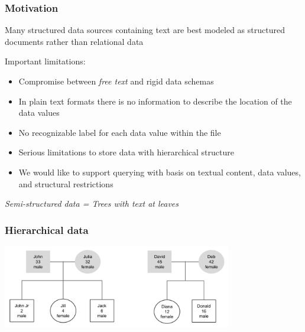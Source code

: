 \documentclass[svgnames]{beamer}
\begin{document}
\begin{frame}
\frametitle{Motivation}

\begin{block}{}
Many structured data sources containing text are best modeled as structured documents rather than  relational data
\end{block}

\begin{block}{}
Important limitations:
\begin{itemize}
  \item Compromise between {\it free text} and rigid data schemas
  \item In plain text formats there is no information to describe the location of the data values
  \item No recognizable label for each data value within the file
  \item Serious limitations to store data with hierarchical structure 
  \item We would like to support querying with basis on textual content, data values, and structural restrictions
\end{itemize}
\end{block}

\begin{block}{}
\begin{center}
\emph{Semi-structured data = Trees with text at leaves}
\end{center}
\end{block}

\end{frame}


\begin{frame}
\frametitle{Hierarchical data}
\begin{center}
\includegraphics[width=10cm]{hierarchical_data.pdf}
\end{center}
\end{frame}

\end{document}
